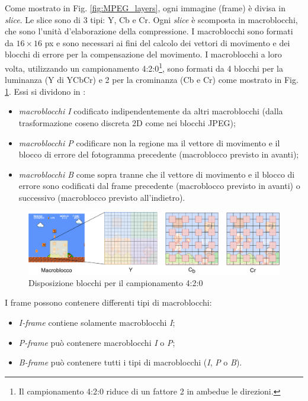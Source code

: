 Come mostrato in Fig. \ref{fig:MPEG_layers}, ogni immagine (frame) è divisa in \textit{slice}. Le slice sono di 3 tipi: Y, Cb e Cr. Ogni \textit{slice} è scomposta in macroblocchi, che sono l'unità d'elaborazione della compressione. I macroblocchi sono formati da $16\times16$ px e sono necessari ai fini del calcolo dei vettori di movimento e dei blocchi di errore per la compensazione del movimento. I macroblocchi a loro volta, utilizzando un campionamento 4:2:0\footnote{Il campionamento 4:2:0 riduce di un fattore 2 in ambedue le direzioni.}, sono formati da 4 blocchi per la luminanza (Y di YCbCr) e 2 per la crominanza (Cb e Cr) come mostrato in Fig. \ref{fig:macroblocchi}. Essi si dividono in \parencite{ProgettazioneEproduzioneMultimediale}:

\begin{itemize}
	\item \textit{macroblocchi I} codificato indipendentemente da altri macroblocchi (dalla trasformazione coseno discreta 2D come nei blocchi JPEG);
	\item \textit{macroblocchi P} codificare non la regione ma il vettore di movimento e il blocco di errore del fotogramma precedente (macroblocco previsto in avanti);
	\item \textit{macroblocchi B} come sopra tranne che il vettore di movimento e il blocco di errore sono codificati dal frame precedente (macroblocco previsto in avanti) o successivo (macroblocco previsto all'indietro).
\end{itemize}

\begin{figure}[H]
	\includegraphics[width=\linewidth]{immagini/macroblocchi}
	\centering
	\caption{Disposizione blocchi per il campionamento 4:2:0}
	\label{fig:macroblocchi}
\end{figure}

I frame possono contenere differenti tipi di macroblocchi:

\begin{itemize}
	\item \textit{I-frame} contiene solamente macroblocchi \textit{I};
	\item \textit{P-frame} può contenere macroblocchi \textit{I} o \textit{P};
	\item \textit{B-frame} può contenere tutti i tipi di macroblocchi (\textit{I}, \textit{P} o \textit{B}).
\end{itemize}

